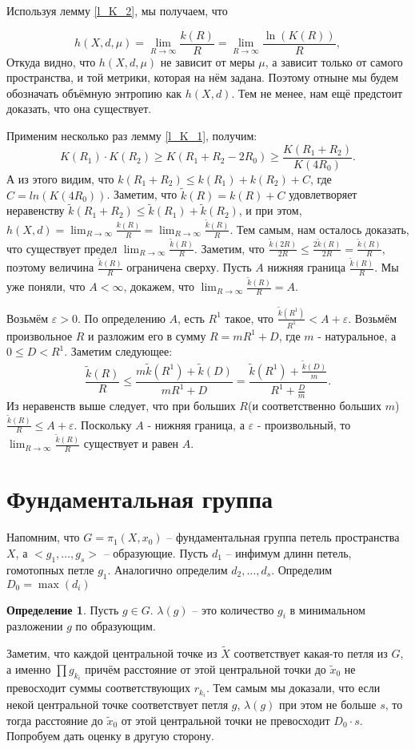 \documentclass[11pt]{article}
\theoremstyle{definition}
\newtheorem{defin}{Определение}%
\theoremstyle{plain}
\theoremstyle{plain}
\def\leq{\leqslant}
\def\geq{\geqslant}
\def\wt#1{\widetilde{#1}}
\def\eps{\varepsilon}
\begin{document}
Используя лемму \ref{l_K_2}, мы получаем, что 

$$
	h(X, d, \mu) = \lim_{R \rightarrow \infty} \frac{k(R)} {R} = \lim_{R \rightarrow \infty} \frac{\ln (K(R))} {R},
$$
Откуда видно, что $h(X, d, \mu)$ не зависит от меры $\mu$, а зависит только от самого пространства, и той метрики, которая на нём задана.
Поэтому отныне мы будем обозначать объёмную энтропию как $h(X, d)$.
Тем не менее, нам ещё предстоит доказать, что она существует.

Применим несколько раз лемму \ref{l_K_1}, получим:
$$
  K(R_1) \cdot K(R_2) \geq K(R_1 + R_2 - 2 R_0) \geq \frac{K(R_1 + R_2)}{K(4 R_0)}.
$$
А из этого видим, что $k(R_1 + R_2) \leq k(R_1) + k(R_2) + C$, где $C = ln(K(4 R_0))$.
Заметим, что $\wt{k}(R) = k(R) + C$ удовлетворяет неравенству $\wt{k}(R_1 + R_2) \leq \wt{k}(R_1) + \wt{k}(R_2)$, и при этом,
$h(X,d) = \lim_{R \rightarrow \infty} \frac{k(R)}{R} = \lim_{R \rightarrow \infty} \frac{\wt{k}(R)}{R}$.
Тем самым, нам осталось доказать, что существует предел $\lim_{R \rightarrow \infty} \frac{\wt{k}(R)}{R}$.
Заметим, что $\frac{\wt{k}(2R)}{2R} \leq \frac{2\wt{k}(R)}{2R} = \frac{\wt{k}(R)}{R}$, поэтому величина $\frac{\wt{k}(R)}{R}$ ограничена сверху.
Пусть $A$ нижняя граница $\frac{\wt{k}(R)}{R}$. Мы уже поняли, что $A < \infty$, докажем, что $\lim_{R \rightarrow \infty} \frac{\wt{k}(R)}{R} = A$.

Возьмём $\eps > 0$. По определению $A$, есть $R^1$ такое, что $\frac{\wt{k}(R^1)}{R^1} < A + \eps$. 
Возьмём произвольное $R$ и разложим его в сумму $R = m R^1 + D$, где $m$ - натуральное, а $0 \leq D < R^1$. 
Заметим следующее:
$$
\frac{\wt{k}(R)}{R} \leq 
\frac{m \wt{k}(R^1) + \wt{k}(D)}{m R^1 + D} =
\frac{\wt{k}(R^1) + \frac{\wt{k}(D)}{m}}{R^1 + \frac{D}{m}} .
$$
Из неравенств выше следует, что при больших $R$(и соответственно больших $m$) $\frac{\wt{k}(R)}{R} \leq A + \eps$. 
Поскольку $A$ - нижняя граница, а $\eps$ - произвольный, то $\lim_{R \rightarrow \infty} \frac{\wt{k}(R)}{R}$ существует и равен $A$.


\section{Фундаментальная группа}
Напомним, что $G = \pi_1(X, x_0)$ -- фундаментальная группа петель пространства $X$, а $<g_1,\dots,g_s>$ -- образующие.
Пусть $d_1$ -- инфимум длинн петель, гомотопных петле $g_1$. Аналогично определим $d_2,\dots,d_s$.
Определим $D_0 = \max(d_i)$
\begin{defin}
Пусть $g \in G$. $\lambda(g)$ -- это количество $g_i$ в минимальном разложении $g$ по образующим.
\end{defin}
Заметим, что каждой центральной точке из $\wt{X}$ соответствует какая-то петля из $G$, а именно $\prod g_{k_i}$ 
причём расстояние от этой центральной точки до $\wt{x}_0$ не превосходит суммы соответствующих $r_{k_i}$. 
Тем самым мы доказали, что если некой центральной точке соответствует петля $g$,
$\lambda(g)$ при этом не больше $s$, то тогда расстояние до $\wt{x}_0$ от этой центральной точки не превосходит $D_0 \cdot s$.
Попробуем дать оценку в другую сторону.
\end{document}
